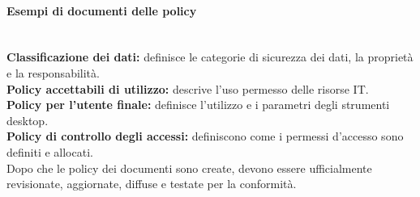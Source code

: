 \paragraph*{Esempi di documenti delle policy} \\

\textbf{Classificazione dei dati:} definisce le categorie di sicurezza dei dati,
la proprietà e la responsabilità.\\
\newline
\textbf{Policy accettabili di utilizzo:} descrive l'uso permesso delle risorse
IT.\\
\newline
\textbf{Policy per l'utente finale:} definisce l'utilizzo e i parametri degli
strumenti desktop.\\
\newline
\textbf{Policy di controllo degli accessi:} definiscono come i permessi
d'accesso sono definiti e allocati.\\
\newline
Dopo che le policy dei documenti sono create, devono essere ufficialmente
revisionate, aggiornate, diffuse e testate per la conformità.
